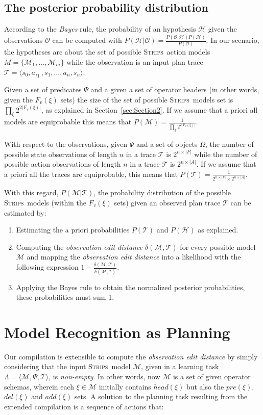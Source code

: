 \documentclass[letterpaper]{article} %
\newcommand{\tup}[1]{{\langle #1 \rangle}}
\newcommand{\strips}{\textsc{Strips}}     %
\begin{document}
\subsection{The posterior probability distribution}
According to the {\em Bayes} rule, the probability of an hypothesis $\mathcal{H}$ given the observations $\mathcal{O}$ can be computed with $P(\mathcal{H}|\mathcal{O})=\frac{P(\mathcal{O}|\mathcal{H})P(\mathcal{H})}{P(\mathcal{O})}$. In our scenario, the hypotheses are about the set of possible \strips\ action models $M=\{\mathcal{M}_1,\ldots,\mathcal{M}_m\}$ while the observation is an input plan trace $\mathcal{T}=\tup{s_0,a,_1,s_1,\ldots,a_n,s_{n}}$.

Given a set of predicates $\Psi$ and a given a set of operator headers (in other words, given the $F_v(\xi)$ sets) the size of the set of possible \strips\ models set is $\prod_\xi 2^{2|F_v(\xi)|}$, as explained in Section~\ref{sec:Section2}. If we assume that a priori all models are equiprobable this means that $P(\mathcal{M})=\frac{1}{\prod_\xi 2^{2|F_v(\xi)|}}$.

With respect to the observations, given $\Psi$ and a set of objects $\Omega$, the number of possible state observations of length $n$ in a trace $\mathcal{T}$ is $2^{n\times|F|}$ while the number of possible action observations of length $n$ in a trace $\mathcal{T}$ is $2^{n\times|A|}$. If we assume that a priori all the traces are equiprobable, this means that $P(\mathcal{T})=\frac{1}{2^{n\times|F|}\times 2^{n\times|A|}}$.

With this regard, $P(\mathcal{M}|\mathcal{T})$, the probability distribution of the possible \strips\ models (within the $F_v(\xi)$ sets) given an observed plan trace $\mathcal{T}$ can be estimated by:
\begin{enumerate}
\item Estimating the a priori probabilities $P(\mathcal{T})$ and $P(\mathcal{H})$ as explained.
\item Computing the {\em observation edit distance} $\delta(\mathcal{M},\mathcal{T})$ for every possible model $\mathcal{M}$ and mapping the {\em observation edit distance} into a likelihood with the following expression $1-\frac{\delta(\mathcal{M},\mathcal{T})}{\delta(\mathcal{M},*)}$. 
\item Applying the Bayes rule to obtain the normalized posterior probabilities, these probabilities must sum 1.
\end{enumerate}


\section{Model Recognition as Planning}
Our compilation is extensible to compute the {\em observation edit distance} by simply considering that the input \strips\ model $\mathcal{M}$, given in a learning task $\Lambda=\tup{\mathcal{M},\Psi,\mathcal{T}}$, is {\em non-empty}. In other words, now $\mathcal{M}$ is a set of given operator schemas, wherein each $\xi\in\mathcal{M}$ initially contains $head(\xi)$ but also the $pre(\xi)$, $del(\xi)$ and $add(\xi)$ sets. A solution to the planning task resulting from the extended compilation is a sequence of actions that:
\end{document}
